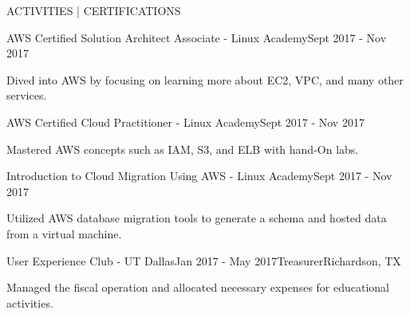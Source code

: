 \documentclass[9.5pt,a4paper, typewriter]{resume} %
\begin{document}
\begin{rSection}{ACTIVITIES | CERTIFICATIONS}
\begin{rSubsection}{AWS Certified Solution Architect Associate - Linux Academy}{Sept 2017 - Nov 2017}{}{}
\item Dived into AWS by focusing on learning more about EC2, VPC, and many other services.
\end{rSubsection}
\begin{rSubsection}{AWS Certified Cloud Practitioner - Linux Academy}{Sept 2017 - Nov 2017}{}{}
\item Mastered AWS concepts such as IAM, S3, and ELB with hand-On labs.  
\end{rSubsection}
\begin{rSubsection}{Introduction to Cloud Migration Using AWS - Linux Academy}{Sept 2017 - Nov 2017}{}{}
\item Utilized AWS database migration tools to generate a schema and hosted data from a virtual machine. 
\end{rSubsection}
\begin{rSubsection}{User Experience Club - UT Dallas}{Jan 2017 - May 2017}{Treasurer}{Richardson, TX}
\item Managed the fiscal operation and allocated necessary expenses for educational activities.
\end{rSubsection}
\end{rSection}




\end{document}
